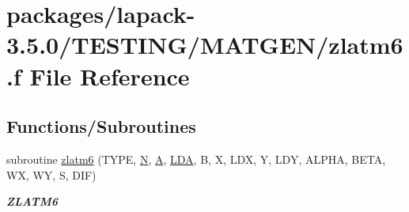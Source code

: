 \hypertarget{zlatm6_8f}{}\section{packages/lapack-\/3.5.0/\+T\+E\+S\+T\+I\+N\+G/\+M\+A\+T\+G\+E\+N/zlatm6.f File Reference}
\label{zlatm6_8f}
\subsection*{Functions/\+Subroutines}
\begin{DoxyCompactItemize}
\item 
subroutine \hyperlink{group__complex16__matgen_gab090f307aa94b87f91bf1bc0b3475353}{zlatm6} (T\+Y\+P\+E, \hyperlink{polmisc_8c_a0240ac851181b84ac374872dc5434ee4}{N}, \hyperlink{classA}{A}, \hyperlink{example__user_8c_ae946da542ce0db94dced19b2ecefd1aa}{L\+D\+A}, B, X, L\+D\+X, Y, L\+D\+Y, A\+L\+P\+H\+A, B\+E\+T\+A, W\+X, W\+Y, S, D\+I\+F)
\begin{DoxyCompactList}\small\item\em {\bfseries Z\+L\+A\+T\+M6} \end{DoxyCompactList}\end{DoxyCompactItemize}
